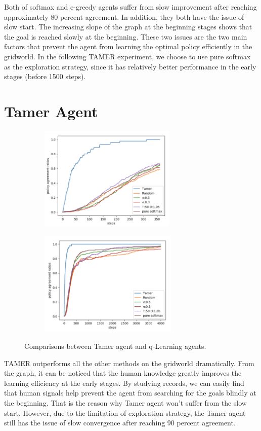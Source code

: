 \documentclass{article}
\begin{document}
Both of softmax and e-greedy agents suffer from slow improvement after reaching approximately 80 percent agreement. In addition, they both have the issue of slow start. The increasing slope of the graph at the beginning stages shows that the goal is reached slowly at the beginning. These two issues are the two main factors that prevent the agent from learning the optimal policy efficiently in the gridworld. In the following TAMER experiment, we choose to use pure softmax as the exploration strategy, since it has relatively better performance in the early stages (before 1500 steps).


\section{Tamer Agent}
\begin{figure}[h]
	\begin{subfigure}{0.5\textwidth}
		\includegraphics[width=0.9\linewidth, height=5cm]{images/all_0_400.png} 
		\caption{}
	\end{subfigure}
	\begin{subfigure}{0.5\textwidth}
		\includegraphics[width=0.9\linewidth, height=5cm]{images/all_0_4000.png}
		\caption{}
	\end{subfigure}
	\caption{Comparisons between Tamer agent and q-Learning agents.}
\end{figure}

TAMER outperforms all the other methods on the gridworld dramatically. From the graph, it can be noticed that the human knowledge greatly improves the learning efficiency at the early stages. By studying records, we can easily find that human signals help prevent the agent from searching for the goals blindly at the beginning. That is the reason why Tamer agent won't suffer from the slow start. However, due to the limitation of exploration strategy, the Tamer agent still has the issue of slow convergence after reaching 90 percent agreement.
\end{document}
